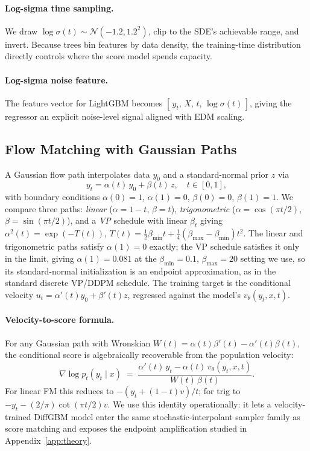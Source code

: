 \documentclass{article}
\newcommand{\Norm}{\mathcal{N}}
\begin{document}
\paragraph{Log-sigma time sampling.} We draw $\log\sigma(t) \sim \Norm(-1.2, 1.2^2)$, clip to the SDE's achievable range, and invert. Because trees bin features by data density, the training-time distribution directly controls where the score model spends capacity.

\paragraph{Log-sigma noise feature.} The feature vector for LightGBM becomes $[\,y_t,\,X,\,t,\,\log\sigma(t)\,]$, giving the regressor an explicit noise-level signal aligned with EDM scaling.

\subsection{Flow Matching with Gaussian Paths}\label{sec:fm}
A Gaussian flow path interpolates data $y_0$ and a standard-normal prior $z$ via
\begin{equation}\label{eq:path}
y_t = \alpha(t)\, y_0 + \beta(t)\, z, \quad t \in [0,1],
\end{equation}
with boundary conditions $\alpha(0)=1$, $\alpha(1)=0$, $\beta(0)=0$, $\beta(1)=1$. We compare three paths: \emph{linear} ($\alpha = 1-t$, $\beta = t$), \emph{trigonometric} ($\alpha = \cos(\pi t/2)$, $\beta = \sin(\pi t /2)$), and a \emph{VP} schedule with linear $\beta_t$ giving $\alpha^2(t) = \exp(-T(t))$, $T(t) = \tfrac{1}{2}\beta_{\min} t + \tfrac{1}{4}(\beta_{\max} - \beta_{\min}) t^2$. The linear and trigonometric paths satisfy $\alpha(1)=0$ exactly; the VP schedule satisfies it only in the limit, giving $\alpha(1)=0.081$ at the $\beta_{\min}=0.1$, $\beta_{\max}=20$ setting we use, so its standard-normal initialization is an endpoint approximation, as in the standard discrete VP/DDPM schedule. The training target is the conditional velocity $u_t = \alpha'(t) y_0 + \beta'(t) z$, regressed against the model's $v_\theta(y_t, x, t)$.

\paragraph{Velocity-to-score formula.} For any Gaussian path with Wronskian $W(t) = \alpha(t) \beta'(t) - \alpha'(t) \beta(t)$, the conditional score is algebraically recoverable from the population velocity:
\begin{equation}\label{eq:score}
\nabla \log p_t(y_t \mid x) \;=\; \frac{\alpha'(t)\, y_t - \alpha(t)\, v_\theta(y_t, x, t)}{W(t)\,\beta(t)}.
\end{equation}
For linear FM this reduces to $-(y_t + (1-t) v)/t$; for trig to $-y_t - (2/\pi)\cot(\pi t/2) v$.
We use this identity operationally: it lets a velocity-trained DiffGBM model enter the same stochastic-interpolant sampler family as score matching and exposes the endpoint amplification studied in Appendix~\ref{app:theory}.
\end{document}
